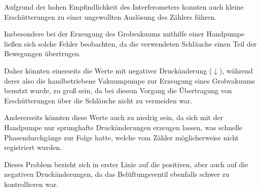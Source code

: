 Aufgrund der hohen Empfindlichkeit des Interferometers
konnten auch kleine Erschütterungen zu einer ungewollten Auslösung des Zählers führen.

Insbesondere bei der Erzeugung des Grobvakuums
mithilfe einer Handpumpe
ließen sich solche Fehler beobachten,
da die verwendeten Schläuche einen Teil der Bewegungen übertrugen.

Daher könnten einerseits die Werte mit negativer Druckänderung ($\downarrow$),
während derer also die handbetriebene Vakuumpumpe zur Erzeugung eines Grobvakuums benutzt wurde,
zu groß sein,
da bei diesem Vorgang die Übertragung von Erschütterungen über die Schläuche nicht zu vermeiden war.

Andererseits könnten diese Werte auch zu niedrig sein,
da sich mit der Handpumpe nur sprunghafte Druckänderungen erzeugen lassen,
was schnelle Phasendurchgänge %
zur Folge hatte,
welche vom Zähler möglicherweise nicht registriert wurden.

Dieses Problem bezieht sich in erster Linie auf die positiven,
aber auch auf die negativen Druckänderungen,
da das Belüftungsventil ebenfalls schwer zu kontrollieren war.

